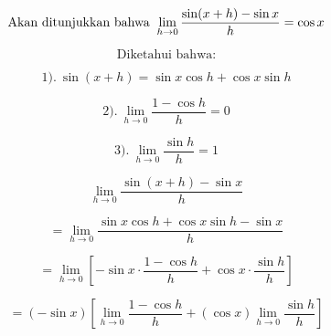 \documentclass{article}
\begin{document}
\begin{eulernotebook}
\begin{eulercomment}
\begin{eulercomment}
\begin{eulercomment}
\begin{eulercomment}
\begin{eulercomment}
\end{eulercomment}
\begin{eulerformula}
\[
\text{Akan ditunjukkan bahwa\: $\lim_{h\to 0} \frac{\sin(x+h)-\sin x}{h}=\cos x$}
\]
\end{eulerformula}
\begin{eulercomment}
\end{eulercomment}
\begin{eulerformula}
\[
\text{Diketahui bahwa:}
\]
\end{eulerformula}
\begin{eulercomment}
\end{eulercomment}
\begin{eulerformula}
\[
\text{$1).\: \sin(x+h)=\sin x\cos h+\cos x\sin h$}
\]
\end{eulerformula}
\begin{eulerformula}
\[
\text{$2).\: \lim_{h\to 0} \frac{1-\cos h}{h}=0$}
\]
\end{eulerformula}
\begin{eulerformula}
\[
\text{$3).\: \lim_{h\to 0} \frac{\sin h}{h}=1$}
\]
\end{eulerformula}
\begin{eulercomment}
\end{eulercomment}
\begin{eulerformula}
\[
\text{$\lim_{h\to 0} \frac{\sin(x+h)-\sin x}{h}$}
\]
\end{eulerformula}
\begin{eulercomment}
\end{eulercomment}
\begin{eulerformula}
\[
\text{$=\lim_{h\to 0} \frac{\sin x\cos h+\cos x\sin h-\sin x}{h}$}
\]
\end{eulerformula}
\begin{eulercomment}
\end{eulercomment}
\begin{eulerformula}
\[
\text{$=\lim_{h\to 0} \left[-\sin x\cdot\frac{1-\cos h}{h}+\cos x\cdot\frac{\sin h}{h}\right]$}
\]
\end{eulerformula}
\begin{eulercomment}
\end{eulercomment}
\begin{eulerformula}
\[
\text{$=(-\sin x)\left[\lim_{h\to 0} \frac{1-\cos h}{h}+(\cos x)\lim_{h\to 0} \frac{\sin h}{h}\right]$}
\]
\end{eulerformula}

\end{eulercomment}
\end{eulercomment}
\end{eulercomment}
\end{eulercomment}
\end{eulernotebook}
\end{document}
